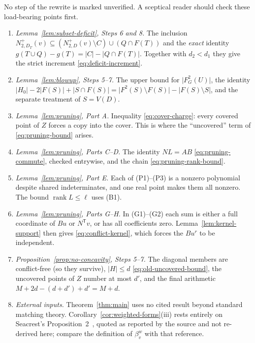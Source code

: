 \documentclass[11pt]{article}
\theoremstyle{remark}
\newcommand{\abs}[1]{\lvert #1\rvert}
\DeclareMathOperator{\rank}{rank}
\begin{document}
No step of the rewrite is marked unverified.  A sceptical reader should
check these load-bearing points first.
\begin{enumerate}[leftmargin=*]
\item \emph{Lemma~\ref{lem:subset-deficit}, Steps 6 and 8.}  The inclusion
$N_{2,D_T}^+(v)\subseteq(N_{2,D}^+(v)\setminus C)\cup(Q\cap F(T))$ and the
\emph{exact} identity $g(T\cup Q)-g(T)=\abs C-\abs{Q\cap F(T)}$.  Together
with $d_2<d_1$ they give the strict increment
\eqref{eq:deficit-increment}.
\item \emph{Lemma~\ref{lem:blowup}, Steps 5--7.}  The upper bound for
$\abs{F_G^2(U)}$, the identity
$\abs{H_0}-2\abs{F(S)}+\abs{S\cap F(S)}
=\abs{F^2(S)\setminus F(S)}-\abs{F(S)\setminus S}$, and the separate
treatment of $S=V(D)$.
\item \emph{Lemma~\ref{lem:pruning}, Part A.}  Inequality
\eqref{eq:cover-charge}: every covered point of $Z$ forces a copy into the
cover.  This is where the ``uncovered'' term of \eqref{eq:pruning-bound}
arises.
\item \emph{Lemma~\ref{lem:pruning}, Parts C--D.}  The identity $NL=AB$
\eqref{eq:pruning-commute}, checked entrywise, and the chain
\eqref{eq:pruning-rank-bound}.
\item \emph{Lemma~\ref{lem:pruning}, Part E.}  Each of (P1)--(P3) is a
nonzero polynomial despite shared indeterminates, and one real point makes
them all nonzero.  The bound $\rank L\le\ell$ uses (B1).
\item \emph{Lemma~\ref{lem:pruning}, Parts G--H.}  In (G1)--(G2) each sum is
either a full coordinate of $Bu$ or $N^{\mathsf T}v$, or has all
coefficients zero.  Lemma~\ref{lem:kernel-support} then gives
\eqref{eq:conflict-kernel}, which forces the $Bu^r$ to be independent.
\item \emph{Proposition~\ref{prop:no-concavity}, Steps 5--7.}  The diagonal
members are conflict-free (so they survive), $\abs H\le d$
\eqref{eq:old-uncovered-bound}, the uncovered points of $Z$ number at most
$d'$, and the final arithmetic $M+2d-(d+d')+d'=M+d$.
\item \emph{External inputs.}  Theorem~\ref{thm:main} uses no cited result
beyond standard matching theory.  Corollary~\ref{cor:weighted-forms}(iii)
rests entirely on Seacrest's Proposition~2~\cite{Seacrest2015}, quoted as
reported by the source and not re-derived here; compare the definition of
$\beta_v^w$ with that reference.
\end{enumerate}



\end{document}
